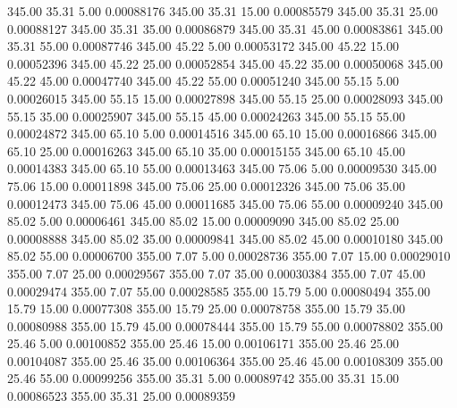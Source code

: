     345.00     35.31      5.00     0.00088176
    345.00     35.31     15.00     0.00085579
    345.00     35.31     25.00     0.00088127
    345.00     35.31     35.00     0.00086879
    345.00     35.31     45.00     0.00083861
    345.00     35.31     55.00     0.00087746
    345.00     45.22      5.00     0.00053172
    345.00     45.22     15.00     0.00052396
    345.00     45.22     25.00     0.00052854
    345.00     45.22     35.00     0.00050068
    345.00     45.22     45.00     0.00047740
    345.00     45.22     55.00     0.00051240
    345.00     55.15      5.00     0.00026015
    345.00     55.15     15.00     0.00027898
    345.00     55.15     25.00     0.00028093
    345.00     55.15     35.00     0.00025907
    345.00     55.15     45.00     0.00024263
    345.00     55.15     55.00     0.00024872
    345.00     65.10      5.00     0.00014516
    345.00     65.10     15.00     0.00016866
    345.00     65.10     25.00     0.00016263
    345.00     65.10     35.00     0.00015155
    345.00     65.10     45.00     0.00014383
    345.00     65.10     55.00     0.00013463
    345.00     75.06      5.00     0.00009530
    345.00     75.06     15.00     0.00011898
    345.00     75.06     25.00     0.00012326
    345.00     75.06     35.00     0.00012473
    345.00     75.06     45.00     0.00011685
    345.00     75.06     55.00     0.00009240
    345.00     85.02      5.00     0.00006461
    345.00     85.02     15.00     0.00009090
    345.00     85.02     25.00     0.00008888
    345.00     85.02     35.00     0.00009841
    345.00     85.02     45.00     0.00010180
    345.00     85.02     55.00     0.00006700
    355.00      7.07      5.00     0.00028736
    355.00      7.07     15.00     0.00029010
    355.00      7.07     25.00     0.00029567
    355.00      7.07     35.00     0.00030384
    355.00      7.07     45.00     0.00029474
    355.00      7.07     55.00     0.00028585
    355.00     15.79      5.00     0.00080494
    355.00     15.79     15.00     0.00077308
    355.00     15.79     25.00     0.00078758
    355.00     15.79     35.00     0.00080988
    355.00     15.79     45.00     0.00078444
    355.00     15.79     55.00     0.00078802
    355.00     25.46      5.00     0.00100852
    355.00     25.46     15.00     0.00106171
    355.00     25.46     25.00     0.00104087
    355.00     25.46     35.00     0.00106364
    355.00     25.46     45.00     0.00108309
    355.00     25.46     55.00     0.00099256
    355.00     35.31      5.00     0.00089742
    355.00     35.31     15.00     0.00086523
    355.00     35.31     25.00     0.00089359
